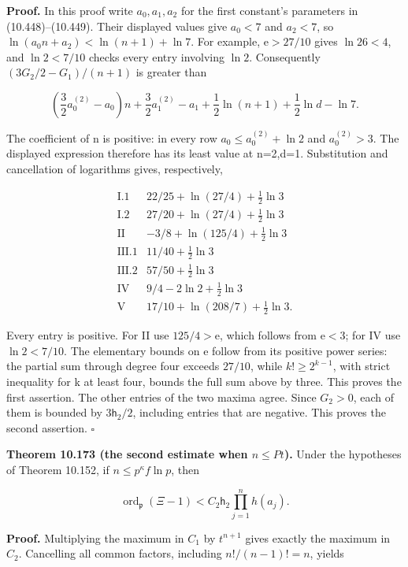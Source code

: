 \documentclass[
  11pt,
  a4paper,
]{article}
\begin{document}
\textbf{Proof.} In this proof write \(a_0,a_1,a_2\) for the first
constant's parameters in (10.448)--(10.449). Their displayed values give
\(a_0<7\) and \(a_2<7\), so \(\ln(a_0n+a_2)<\ln(n+1)+\ln7\). For
example, \(\mathrm e>27/10\) gives \(\ln26<4\), and \(\ln2<7/10\) checks
every entry involving \(\ln2\). Consequently \((3G_2/2-G_1)/(n+1)\) is
greater than

\[
\left(\frac32a_0^{(2)}-a_0\right)n
+\frac32a_1^{(2)}-a_1+\frac12\ln(n+1)
+\frac12\ln d-\ln7.
\tag{10.645}
\]

The coefficient of n is positive: in every row \(a_0\le a_0^{(2)}+\ln2\)
and \(a_0^{(2)}>3\). The displayed expression therefore has its least
value at n=2,d=1. Substitution and cancellation of logarithms gives,
respectively,

\[
\begin{array}{c|c}
\mathrm{I.1}&22/25+\ln(27/4)+\tfrac12\ln3\\
\mathrm{I.2}&27/20+\ln(27/4)+\tfrac12\ln3\\
\mathrm{II}&-3/8+\ln(125/4)+\tfrac12\ln3\\
\mathrm{III.1}&11/40+\tfrac12\ln3\\
\mathrm{III.2}&57/50+\tfrac12\ln3\\
\mathrm{IV}&9/4-2\ln2+\tfrac12\ln3\\
\mathrm V&17/10+\ln(208/7)+\tfrac12\ln3.
\end{array}
\tag{10.646}
\]

Every entry is positive. For II use \(125/4>\mathrm e\), which follows
from \(\mathrm e<3\); for IV use \(\ln2<7/10\). The elementary bounds on
\(\mathrm e\) follow from its positive power series: the partial sum
through degree four exceeds \(27/10\), while \(k!\ge2^{k-1}\), with
strict inequality for k at least four, bounds the full sum above by
three. This proves the first assertion. The other entries of the two
maxima agree. Since \(G_2>0\), each of them is bounded by
\(3\mathsf h_2/2\), including entries that are negative. This proves the
second assertion. \(\square\)

\textbf{Theorem 10.173 (the second estimate when \(n\le Pt\)).} Under
the hypotheses of Theorem 10.152, if \(n\le p^\kappa f\ln p\), then

\[
\operatorname{ord}_{\mathfrak p}(\Xi-1)
<C_2\mathsf h_2\prod_{j=1}^nh(a_j).
\tag{10.647}
\]

\textbf{Proof.} Multiplying the maximum in \(C_1\) by \(t^{n+1}\) gives
exactly the maximum in \(C_2\). Cancelling all common factors, including
\(n!/(n-1)!=n\), yields
\end{document}
